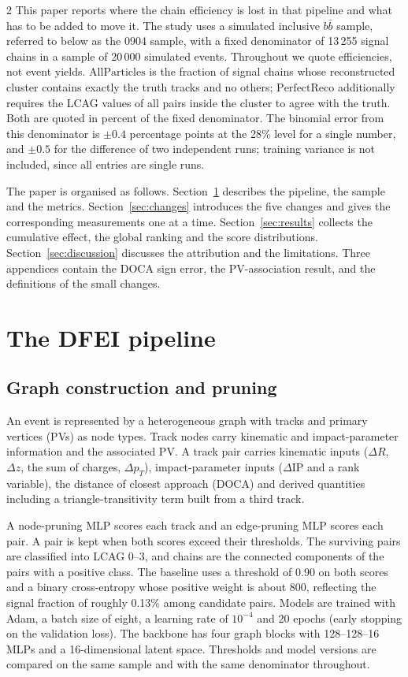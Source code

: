 \documentclass[10pt]{article}
\newcommand{\All}{\ensuremath{\mathrm{AllParticles}}}
\newcommand{\Perf}{\ensuremath{\mathrm{PerfectReco}}}
\begin{document}
\begin{multicols}{2}
This paper reports where the chain efficiency is lost in that pipeline and what has to be added to move it. The study uses a simulated inclusive $b\bar b$ sample, referred to below as the 0904 sample, with a fixed denominator of 13\,255 signal chains in a sample of 20\,000 simulated events. Throughout we quote efficiencies, not event yields. \All{} is the fraction of signal chains whose reconstructed cluster contains exactly the truth tracks and no others; \Perf{} additionally requires the LCAG values of all pairs inside the cluster to agree with the truth. Both are quoted in percent of the fixed denominator. The binomial error from this denominator is $\pm0.4$ percentage points at the 28\% level for a single number, and $\pm0.5$ for the difference of two independent runs; training variance is not included, since all entries are single runs.

The paper is organised as follows. Section~\ref{sec:pipeline} describes the pipeline, the sample and the metrics. Section~\ref{sec:changes} introduces the five changes and gives the corresponding measurements one at a time. Section~\ref{sec:results} collects the cumulative effect, the global ranking and the score distributions. Section~\ref{sec:discussion} discusses the attribution and the limitations. Three appendices contain the DOCA sign error, the PV-association result, and the definitions of the small changes.

\section{The DFEI pipeline}
\label{sec:pipeline}

\subsection{Graph construction and pruning}

An event is represented by a heterogeneous graph with tracks and primary vertices (PVs) as node types. Track nodes carry kinematic and impact-parameter information and the associated PV. A track pair carries kinematic inputs ($\Delta R$, $\Delta z$, the sum of charges, $\Delta p_T$), impact-parameter inputs ($\Delta$IP and a rank variable), the distance of closest approach (DOCA) and derived quantities including a triangle-transitivity term built from a third track.

A node-pruning MLP scores each track and an edge-pruning MLP scores each pair. A pair is kept when both scores exceed their thresholds. The surviving pairs are classified into LCAG 0--3, and chains are the connected components of the pairs with a positive class. The baseline uses a threshold of 0.90 on both scores and a binary cross-entropy whose positive weight is about 800, reflecting the signal fraction of roughly 0.13\% among candidate pairs. Models are trained with Adam, a batch size of eight, a learning rate of $10^{-4}$ and 20 epochs (early stopping on the validation loss). The backbone has four graph blocks with 128--128--16 MLPs and a 16-dimensional latent space. Thresholds and model versions are compared on the same sample and with the same denominator throughout.


\end{multicols}
\end{document}
